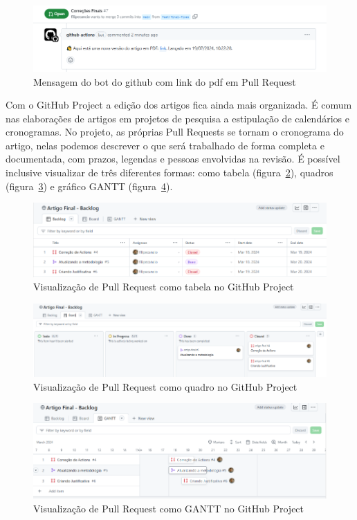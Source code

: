 \begin{figure}[H]
	\centering
	\includegraphics[width=.6\textwidth]{./images/fig06.png}
	\caption{Mensagem do bot do github com link do pdf em Pull Request}
	\label{fig:fig06}
\end{figure}

Com o GitHub Project a edição dos artigos fica ainda mais organizada. É comum nas elaborações de artigos em projetos de pesquisa a estipulação de calendários e cronogramas. No projeto, as próprias Pull Requests se tornam o cronograma do artigo, nelas podemos descrever o que será trabalhado de forma completa e documentada, com prazos, legendas e pessoas envolvidas na revisão. É possível inclusive visualizar de três diferentes formas: como tabela (figura~\ref{fig:fig07}), quadros (figura~\ref{fig:fig08}) e gráfico GANTT (figura~\ref{fig:fig09}).

\begin{figure}[H]
	\centering
	\includegraphics[width=.8\textwidth]{./images/fig07.png}
	\caption{Visualização de Pull Request como tabela no GitHub Project}
	\label{fig:fig07}
\end{figure}

\begin{figure}[ht]
	\centering
	\includegraphics[width=.8\textwidth]{./images/fig08.png}
	\caption{Visualização de Pull Request como quadro no GitHub Project}
	\label{fig:fig08}
\end{figure}

\begin{figure}[ht]
	\centering
	\includegraphics[width=.8\textwidth]{./images/fig09.png}
	\caption{Visualização de Pull Request como GANTT no GitHub Project}
	\label{fig:fig09}
\end{figure}

